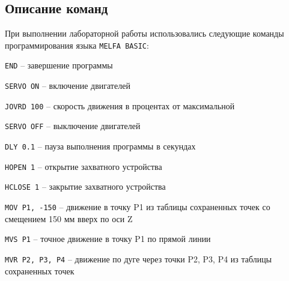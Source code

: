 \documentclass[a4paper, 12pt]{article}
\begin{document}
    \subsection{Описание команд}
    При выполнении лабораторной работы использовались следующие команды программирования языка \texttt{MELFA BASIC}:
    \begin{compactitem}
    \item \texttt{END} -- завершение программы
    \item \texttt{SERVO ON} -- включение двигателей
    \item \texttt{JOVRD 100} -- скорость движения в процентах от максимальной
    \item \texttt{SERVO OFF} -- выключение двигателей
    \item \texttt{DLY 0.1} -- пауза выполнения программы в секундах
    \item \texttt{HOPEN 1} -- открытие захватного устройства
    \item \texttt{HCLOSE 1} -- закрытие захватного устройства 
    \item \texttt{MOV P1, -150} -- движение в точку P1 из таблицы сохраненных точек со смещением 150 мм вверх по оси Z
    \item \texttt{MVS P1} -- точное движение в точку P1 по прямой линии
    \item \texttt{MVR P2, P3, P4} -- движение по дуге через точки P2, P3, P4 из таблицы сохраненных точек
    \end{compactitem}
\end{document}

